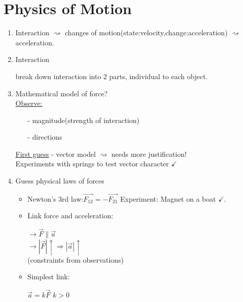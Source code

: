 \documentclass[a4paper, 12pt]{article}
\begin{document}
\section{Physics of Motion}
\begin{enumerate}
\item Interaction $\rightsquigarrow$ changes of motion(state:velocity,change:acceleration) $\rightsquigarrow$ acceleration.
\item Interaction 
\begin{center}
\end{center}
break down interaction into 2 parts, individual to each object.
\item Mathematical model of force?\\
\underline{Observe:}
\begin{itemize}
\item[-] magnitude(strength of interaction)
\item[-] directions
\end{itemize}
\underline{First guess} - vector model $\rightsquigarrow$ needs more justification!\\
Experiments with springs to test vector character $\checkmark$
\item Guess physical laws of forces
\begin{itemize}
\item Newton's 3rd law:$\vec{F_{12}} = -\vec{F_{21}}$
Experiment: Magnet on a boat $\checkmark$.
\item Link force and acceleration:
\begin{center}
$\rightarrow \vec{F} \parallel \vec{a}$\\$
\rightarrow |\vec{F}| \uparrow \Rightarrow |\vec{a}|\uparrow$\\(constraints from observations)
\end{center}
\item Simplest link:
\begin{center}
$\vec{a} = k\vec{F}$  $k>0$ 
\end{center}

\end{itemize}
\end{enumerate}
\end{document}
